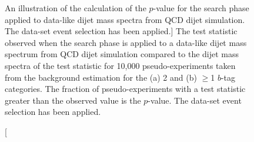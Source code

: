 \begin{figure}[!ht]
  \begin{center}
    \captionsetup[subfigure]{aboveskip=0pt,justification=centering}
  \end{center}
  \vspace{-1em}
  \caption
      [An illustration of the calculation of the \bh{} $p$-value for the search phase applied to data-like dijet mass spectra from QCD dijet simulation.
        The \summer{} data-set event selection has been applied.]
      {The \bh{} test statistic observed when the search phase is applied to a data-like dijet mass spectrum from QCD dijet simulation
        compared to the dijet mass spectra of the \bh{} test statistic for 10,000 pseudo-experiments taken from the background estimation for
        the (a) 2 and (b) $\geq$1 $b$-tag categories.
        The fraction of pseudo-experiments with a \bh{} test statistic greater than the observed value is the \bh{} \mbox{$p$-value}.
        The \summer{} data-set event selection has been applied.}
  \label{fig:DataLikeStatPlots_bh}
\end{figure}




